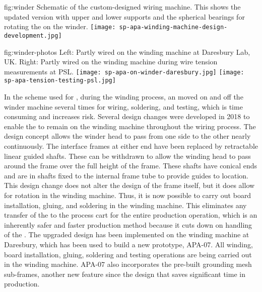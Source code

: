 \begin{dunefigure}{fig:winder}
{Schematic of the custom-designed  wiring machine.  This shows the updated version with upper and lower supports and the spherical bearings for rotating the  on the winder.}
\texttt{[image: sp-apa-winding-machine-design-development.jpg]} 
\end{dunefigure}

\begin{dunefigure}{fig:winder-photos}
{Left: Partly wired   on the winding machine at Daresbury Lab, UK. Right: Partly wired   on the winding machine during wire tension measurements at PSL.}
\texttt{[image: sp-apa-on-winder-daresbury.jpg]}
\texttt{[image: sp-apa-tension-testing-psl.jpg]}
\end{dunefigure}

In the scheme used for , during the winding process, an  moved on and off the winder machine several times for wiring, soldering, and testing, which is time consuming and increases risk.  Several design changes were developed in 2018 to enable the  to remain on the winding machine throughout the wiring process. The design concept allows the winder head to pass from one side to the other nearly continuously. The interface frames at either end have been replaced by retractable linear guided shafts. These can be withdrawn to allow the winding head to pass around the frame over the full height of the frame. These shafts have conical ends and are in shafts fixed to the internal frame tube to provide guides to location. This design change does not alter the design of the frame itself, but it does allow for rotation in the winding machine. Thus, it is now possible to carry out board installation, gluing, and soldering in the winding machine. This eliminates any transfer of the  to the process cart for the entire production operation, which is an inherently safer and faster production method because it cuts down on handling of the .  The upgraded design has been implemented on the winding machine at Daresbury, which has been used to build a new prototype, APA-07. All winding, board installation, gluing, soldering and testing operations are being carried out in the winding machine. APA-07 also incorporates the pre-built grounding mesh sub-frames, another new feature since the  design that saves significant time in production.  

